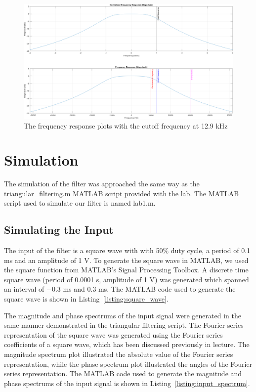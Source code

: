 \documentclass[12pt]{article}
\begin{document}
\begin{figure}[h!]
    \includegraphics[width=\textwidth]{max_frequency_response.png}
    \caption{\label{fig:max_freq_response} The frequency response plots with the cutoff frequency at 12.9 kHz}
\end{figure}


\clearpage
\section*{Simulation}
The simulation of the filter was approached the same way as the triangular\_filtering.m MATLAB script provided with the lab. The MATLAB script used to simulate our filter is named lab1.m.

\subsection*{Simulating the Input}
The input of the filter is a square wave with with 50\% duty cycle, a period of 0.1 ms and an amplitude of 1 V. To generate the square wave in MATLAB, we used the square function from MATLAB's Signal Processing Toolbox. A discrete time square wave (period of 0.0001 s, amplitude of 1 V) was generated which spanned an interval of $-0.3$ ms and $0.3$ ms. The MATLAB code used to generate the square wave is shown in Listing~\ref{listing:square_wave}.


The magnitude and phase spectrums of the input signal were generated in the same manner demonstrated in the triangular filtering script. The Fourier series representation of the square wave was generated using the Fourier series coefficients of a square wave, which has been discussed previously in lecture. The magnitude spectrum plot illustrated the absolute value of the Fourier series representation, while the phase spectrum plot illustrated the angles of the Fourier series representation. The MATLAB code used to generate the magnitude and phase spectrums of the input signal is shown in Listing~\ref{listing:input_spectrum}.

\end{document}
